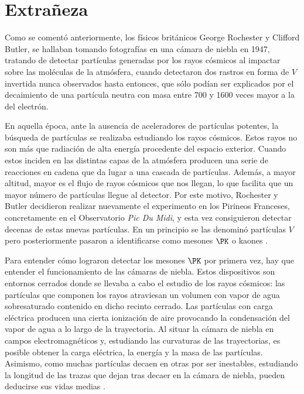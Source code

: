 \chapter{Extrañeza}\label{cap:strangeness}
Como se comentó anteriormente, los físicos británicos George Rochester y Clifford Butler, se hallaban tomando fotografías en una cámara de niebla en 1947, tratando de detectar partículas generadas por los rayos cósmicos al impactar sobre las moléculas de la atmósfera, cuando detectaron dos rastros en forma de $V$ invertida nunca observados hasta entonces, que sólo podían ser explicados por el decaimiento de una partícula neutra con masa entre 700 y 1600 veces mayor a la del electrón. 

En aquella época, ante la ausencia de aceleradores de partículas potentes, la búsqueda de partículas se realizaba estudiando los rayos cósmicos. Estos rayos no son más que radiación de alta energía procedente del espacio exterior. Cuando estos inciden en las distintas capas de la atmósfera producen una serie de reacciones en cadena que da lugar a una cascada de partículas. Además, a mayor altitud, mayor es el flujo de rayos cósmicos que nos llegan, lo que facilita que un mayor número de partículas llegue al detector. Por este motivo, Rochester y Butler decidieron realizar nuevamente el experimento en los Pirineos Franceses, concretamente en el Observatorio \textit{Pic Du Midi}, y esta vez consiguieron detectar decenas de estas nuevas partículas. En un principio se las denominó partículas $V$ pero posteriormente pasaron a identificarse como mesones $\PK$ o kaones \cite{Griffiths2008}.

Para entender cómo lograron detectar los mesones $\PK$ por primera vez, hay que entender el funcionamiento de las cámaras de niebla. Estos dispositivos son entornos cerrados donde se llevaba a cabo el estudio de los rayos cósmicos: las partículas que componen los rayos atraviesan un volumen con vapor de agua sobresaturado contenido en dicho recinto cerrado. Las partículas con carga eléctrica producen una cierta ionización de aire provocando la condensación del vapor de agua a lo largo de la trayectoria.  Al situar la cámara de niebla en campos electromagnéticos y, estudiando las curvaturas de las trayectorias, es posible obtener la carga eléctrica, la energía y la masa de las partículas.  Asimismo, como muchas partículas decaen en otras por ser inestables, estudiando la longitud de las trazas que dejan tras decaer en la cámara de niebla, pueden deducirse sus vidas medias \cite{notas2020}.

